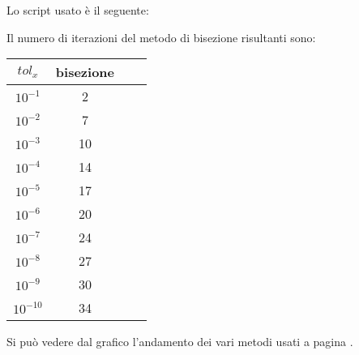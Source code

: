 \begin{flushleft}
Lo script usato è il seguente:

Il numero di iterazioni del metodo di bisezione risultanti sono:

\begin{center}
\begin{tabular}{|c|c|c|c|}
\hline
$tol_x$ & bisezione \\
\hline
$10^{-1}$ & 2 \\
$10^{-2}$ & 7 \\
$10^{-3}$ & 10 \\
$10^{-4}$ & 14 \\
$10^{-5}$ & 17 \\
$10^{-6}$ & 20 \\
$10^{-7}$ & 24 \\
$10^{-8}$ & 27 \\
$10^{-9}$ & 30 \\
$10^{-10}$ & 34 \\
\hline
\end{tabular}
\end{center}

Si può vedere dal grafico l'andamento dei vari metodi usati a pagina \pageref{fes27}.

\end{flushleft}